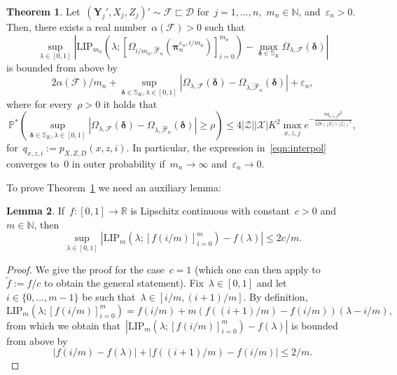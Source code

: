 \documentclass[11pt, a4paper]{article}
\newcommand{\N}{\mathbb{N}}
\newcommand{\R}{\mathbb{R}}
\theoremstyle{definition}
\newtheorem{theorem}{Theorem}[section]
\newtheorem{lemma}[theorem]{Lemma}
\begin{document}
\begin{theorem}\label{thm:interpol}
Let~$(\bm{Y}_j', X_j, Z_j)' \sim \mathcal{F} \sqsubset \mathscr{D}$ for~$j =1, \hdots, n$,~$m_n \in \N$, and~$\varepsilon_n > 0$. Then, there exists a real number~$\alpha(\mathcal{F}) > 0$ such that
%
\begin{equation}\label{eqn:interpol}
\sup_{\lambda \in [0, 1]}\left|\mathrm{LIP}_{m_n}\left(\lambda; \left[\Omega_{i/m_n, \hat{\mathcal{F}}_n}(\bm{\pi}_n^{\varepsilon_n, i/m_n})\right]_{i = 0}^{m_n}\right) - \max_{\bm{\delta} \in \mathbb{S}_K} \Omega_{\lambda, \mathcal{F}}(\bm{\delta})\right|
\end{equation}
%
is bounded from above by $$2\alpha(\mathcal{F})/m_n + \sup_{\bm{\delta} \in \mathbb{S}_K, \lambda \in [0, 1]} |\Omega_{\lambda, \mathcal{F}}(\bm{\delta}) - \Omega_{\lambda, \hat{\mathcal{F}}_n}(\bm{\delta}) | + \varepsilon_n,$$ where for every~$\rho > 0$ it holds that 
%
\begin{equation}\label{eqn:valfun}
\mathbb{P}^*\left( \sup_{\bm{\delta} \in \mathbb{S}_K, \lambda \in [0, 1]} \left|\Omega_{\lambda, \mathcal{F}}(\bm{\delta}) - \Omega_{\lambda, \hat{\mathcal{F}}_n}(\bm{\delta})  \right| \geq \rho \right) \leq  4 | \mathcal{Z}||\mathcal{X}|K^2 \max_{x, z, j}  e^{- \frac{nq_{x,z,j} \rho^2}{128(|\mathcal{X}| \vee |\mathcal{Z}|)^2}},
\end{equation}
for~$q_{x,z,i} := p_{X, Z, D}(x, z, i)$. In particular, the expression in~\eqref{eqn:interpol} converges to~$0$ in outer probability if~$m_n \to \infty$ and~$\varepsilon_n \to 0$.
\end{theorem}
%
To prove Theorem~\ref{thm:interpol} we need an auxiliary lemma:
%
\begin{lemma}\label{lem:auxinterpol}
If~$f: [0, 1] \to \R$ is Lipschitz continuous with constant~$c > 0$ and~$m \in \N$, then $$\sup_{\lambda \in [0, 1]}|\mathrm{LIP}_m(\lambda; [f(i/m)]_{i = 0}^m) - f(\lambda)|\leq 2c/m.$$
\end{lemma}

\begin{proof}
We give the proof for the case~$c = 1$ (which one can then apply to~$\tilde{f} := f/c$ to obtain the general statement). Fix~$\lambda \in [0, 1]$ and let~$i \in \{0, \hdots, m-1\}$ be such that~$\lambda \in [i/m, (i+1)/m]$. By definition, $$ \mathrm{LIP}_m(\lambda; [f(i/m)]_{i = 0}^m) = f(i/m) + m(f((i+1)/m) - f(i/m)) \left(\lambda - i/m\right),$$ from which we obtain that~$|\mathrm{LIP}_m(\lambda; [f(i/m)]_{i = 0}^m) - f(\lambda)|$ is bounded from above by $$|f(i/m) - f(\lambda)| + |f((i+1)/m) - f(i/m)| \leq 2/m.$$
\end{proof}
\end{document}
